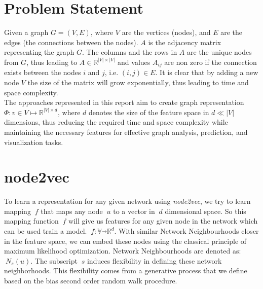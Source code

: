 \documentclass[a4paper,13pt]{article}
\begin{document}
\section{Problem Statement}
Given a graph $G=(V,E)$, where $V$ are the vertices (nodes), and $E$ are the edges (the connections between the nodes). $A$ is the adjacency matrix representing the graph $G$. The columns and the rows in $A$ are the unique nodes from $G$, thus leading to \begin{math}A\in\mathbb{R}^{|V|\times|V|}\end{math} and values $A_{ij}$ are non zero if the connection exists between the nodes $i$ and $j$, i.e. $(i,j)\in E$. It is clear that by adding a new node $V$ the size of the matrix will grow exponentially, thus leading to time and space complexity.\\
The approaches represented in this report aim to create graph representation \begin{math}\Phi:v \in V \mapsto \mathbb{R}^{|V|\times d}\end{math}, where $d$ denotes the size of the feature space in $d \ll |V|$ dimensions, thus reducing the required time and space complexity while maintaining the necessary features for effective graph analysis, prediction, and visualization tasks.

\section{node2vec~\cite{node2vec}}
To learn a representation for any given network using \textit{node2vec}, we try to learn mapping $\ f $ that maps any node $\ u $ to a vector in $\ d $ dimensional space. So this mapping function $\ f $ will give us features for any given node in the network which can be used train a model. $\ f : \mathbb{V} \overrightarrow{} \mathbb{R}^d $. With similar Network Neighbourhoods closer in the feature space, we can embed these nodes using the classical principle of maximum likelihood optimization. Network Neighbourhoods are denoted as: $\ N_{s}(u)$. The subscript $\ s $ induces flexibility in defining these network neighborhoods. This flexibility comes from a generative process that we define based on the bias second order random walk procedure.
\end{document}
